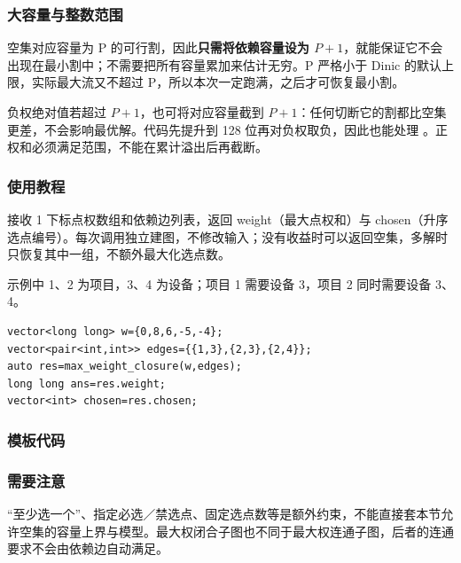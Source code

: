 \subsubsection*{大容量与整数范围}
空集对应容量为 P 的可行割，因此\textbf{只需将依赖容量设为 $P+1$}，就能保证它不会出现在最小割中；不需要把所有容量累加来估计无穷。P 严格小于 Dinic 的默认上限，实际最大流又不超过 P，所以本次一定跑满，之后才可恢复最小割。

负权绝对值若超过 $P+1$，也可将对应容量截到 $P+1$：任何切断它的割都比空集更差，不会影响最优解。代码先提升到 128 位再对负权取负，因此也能处理 。正权和必须满足范围，不能在累计溢出后再截断。

\subsubsection*{使用教程}
 接收 1 下标点权数组和依赖边列表，返回 weight（最大点权和）与 chosen（升序选点编号）。每次调用独立建图，不修改输入；没有收益时可以返回空集，多解时只恢复其中一组，不额外最大化选点数。

示例中 1、2 为项目，3、4 为设备；项目 1 需要设备 3，项目 2 同时需要设备 3、4。
\begin{lstlisting}[style=mtycpp,numbers=none]
vector<long long> w={0,8,6,-5,-4};
vector<pair<int,int>> edges={{1,3},{2,3},{2,4}};
auto res=max_weight_closure(w,edges);
long long ans=res.weight;
vector<int> chosen=res.chosen;
\end{lstlisting}
\subsubsection*{模板代码}

\subsubsection*{需要注意}
“至少选一个”、指定必选／禁选点、固定选点数等是额外约束，不能直接套本节允许空集的容量上界与模型。最大权闭合子图也不同于最大权连通子图，后者的连通要求不会由依赖边自动满足。
